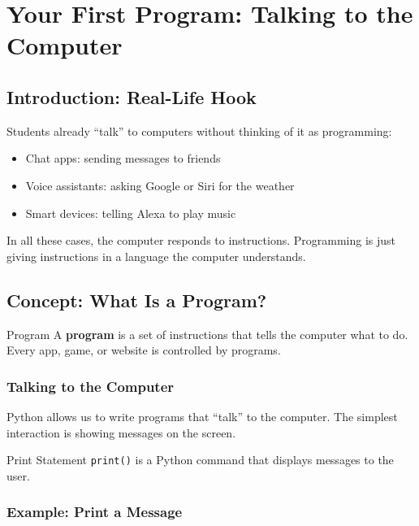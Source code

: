 \chapter{Your First Program: Talking to the Computer}

\section{Introduction: Real-Life Hook}

Students already “talk” to computers without thinking of it as programming:  

\begin{itemize}
    \item Chat apps: sending messages to friends  
    \item Voice assistants: asking Google or Siri for the weather  
    \item Smart devices: telling Alexa to play music  
\end{itemize}

In all these cases, the computer responds to instructions. Programming is just giving instructions in a language the computer understands.

\section{Concept: What Is a Program?}

\begin{definition}{Program}
A \textbf{program} is a set of instructions that tells the computer what to do.  
Every app, game, or website is controlled by programs.
\end{definition}

\subsection{Talking to the Computer}

Python allows us to write programs that “talk” to the computer.  
The simplest interaction is showing messages on the screen.

\begin{definition}{Print Statement}
\texttt{print()} is a Python command that displays messages to the user.
\end{definition}

\subsection{Example: Print a Message}

